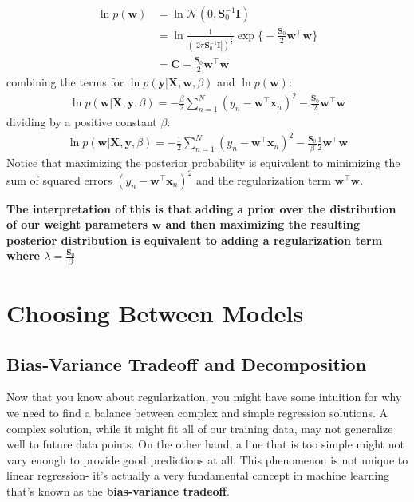 \begin{derivation}
\begin{align*}
        \ln{p(\mathbf{w})} &= \ln{\mathcal{N}(0, \boldsymbol{S}_0^{-1}\mathbf{I})} \\
        &= \ln{\frac{1}{(|2\pi\boldsymbol{S}_0^{-1}\mathbf{I}|)^{\frac{1}{2}}} \exp{\bigg\{-\frac{\boldsymbol{S}_0}{2} \mathbf{w}^\top\mathbf{w}\bigg\}}} \\
        &= \mathbf{C} -\frac{\boldsymbol{S}_0}{2} \mathbf{w}^\top\mathbf{w}
    \end{align*}
    combining the terms for $\ln{p(\mathbf{y}| \mathbf{X}, \mathbf{w}, \beta)}$ and $\ln{p(\mathbf{w})}$:
    \begin{align*}
        \ln{p(\mathbf{w}|\mathbf{X},\mathbf{y}, \beta)} = -\frac{\beta}{2}\sum_{n=1}^{N} (y_n - \mathbf{w}^\top \mathbf{x}_n)^2 - \frac{\boldsymbol{S}_0}{2} \mathbf{w}^\top\mathbf{w}
    \end{align*}
    dividing by a positive constant $\beta$:
    \begin{align*}
        \ln{p(\mathbf{w}|\mathbf{X},\mathbf{y}, \beta)} = -\frac{1}{2}\sum_{n=1}^{N} (y_n - \mathbf{w}^\top \mathbf{x}_n)^2 - \frac{\boldsymbol{S}_0}{\beta}\frac{1}{2} \mathbf{w}^\top\mathbf{w}
    \end{align*}
    Notice that maximizing the posterior probability is equivalent to minimizing the sum of squared errors $(y_n - \mathbf{w}^\top \mathbf{x}_n)^2$ and the regularization term $\mathbf{w}^\top\mathbf{w}$.
\end{derivation}

\textbf{The interpretation of this is that adding a prior over the distribution of our weight parameters $\mathbf{w}$ and then maximizing the resulting posterior distribution is equivalent to adding a regularization term where $\lambda = \frac{\boldsymbol{S}_0}{\beta}$}

\section{Choosing Between Models}
\subsection{Bias-Variance Tradeoff and Decomposition}
Now that you know about regularization, you might have some intuition for why we need to find a balance between complex and simple regression solutions. A complex solution, while it might fit all of our training data, may not generalize well to future data points. On the other hand, a line that is too simple might not vary enough to provide good predictions at all. This phenomenon is not unique to linear regression- it's actually a very fundamental concept in machine learning that's known as the \textbf{bias-variance tradeoff}.

